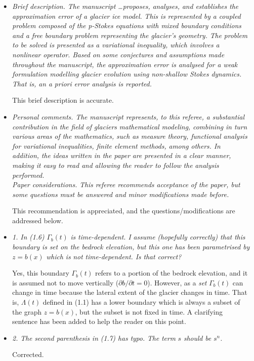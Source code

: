 \documentclass[11pt,reqno]{amsart}
\newcommand{\reply}[2]{%
\medskip
\item \emph{#1}

\medskip
\noindent #2
}
\begin{document}
\begin{itemize}[itemindent=0mm, labelsep=5mm]
\reply{Brief description.  The manuscript \dots proposes, analyses, and establishes the approximation error of a glacier ice model.  This is represented by a coupled problem composed of the p-Stokes equations with mixed boundary conditions and a free boundary problem representing the glacier’s geometry. The problem to be solved is presented as a variational inequality, which involves a nonlinear operator. Based on some conjectures and assumptions made throughout the manuscript, the approximation error is analysed for a weak formulation modelling glacier evolution using non-shallow Stokes dynamics. That is, an a priori error analysis is reported.}
{This brief description is accurate.}

\reply{Personal comments.  The manuscript represents, to this referee, a substantial contribution in the field of glaciers mathematical modeling, combining in turn various areas of the mathematics, such as measure theory, functional analysis for variational inequalities, finite element methods, among others.  In addition, the ideas written in the paper are presented in a clear manner, making it easy to read and allowing the reader to follow the analysis performed. \\ Paper considerations.  This referee recommends acceptance of the paper, but some questions must be answered and minor modifications made before.}
{This recommendation is appreciated, and the questions/modifications are addressed below.}

\reply{1. In (1.6) $\Gamma_b(t)$ is time-dependent. I assume (hopefully correctly) that this boundary is set on the bedrock elevation, but this one has been parametrised by $z = b(x)$ which is not time-dependent. Is that correct?}
{Yes, this boundary $\Gamma_b(t)$ refers to a portion of the bedrock elevation, and it is assumed not to move vertically ($\partial b/\partial t=0$).  However, as a \emph{set} $\Gamma_b(t)$ can change in time because the lateral extent of the glacier changes in time.  That is, $\Lambda(t)$ defined in (1.1) has a lower boundary which is always a subset of the graph $z=b(x)$, but the subset is not fixed in time.  A clarifying sentence has been added to help the reader on this point.}

\reply{2. The second parenthesis in (1.7) has typo. The term $s$ should be $s^n$.}
{Corrected.}


\end{itemize}
\end{document}
